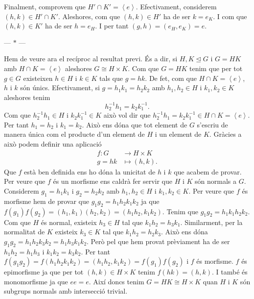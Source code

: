 \documentclass[12pt]{article}
\newcommand{\gen}[1]{\left\langle #1 \right\rangle}
\newcommand{\normal}{\trianglelefteq}
\newcommand{\parbreak}{
	\begin{center}
		--- $\ast$ ---
	\end{center} 
}
\begin{document}
Finalment, comprovem que \( H' \cap K' = \gen{e} \). Efectivament, considerem \( (h,k) \in H' \cap K' \). Aleshores, com que \( (h,k) \in H' \) ha de ser \( k = e_K \). I com que \( (h,k) \in K' \) ha de ser \( h = e_H \). I per tant \( (g,h) = (e_H, e_K) = e \).

\parbreak

Hem de veure ara el recíproc al resultat previ. És a dir, si \( H,K \normal G \) i \( G = HK \) amb \( H \cap K = \gen{e} \) aleshores \( G \cong H \times K \). Com que \( G = HK \) tenim que per tot \( g \in G \) existeixen \( h\in H \) i \( k \in K \) tals que \( g= hk \). De fet, com que \( H \cap K = \gen{e} \), \( h \) i \( k \) són únics. Efectivament, si \( g = h_1k_1 = h_2k_2 \) amb \( h_1,h_2 \in H \) i \( k_1,k_2 \in K \) aleshores tenim  
\begin{equation*}
h_2^{-1}h_1 = k_2k_1^{-1}.
\end{equation*}
Com que \( h_2^{-1}h_1 \in H \) i \( k_2k_1^{-1} \in K \) això vol dir que \( h_2^{-1}h_1 = k_2k_1^{-1} \in H \cap K = \gen{e} \). Per tant \( h_1 = h_2 \) i \( k_1 = k_2 \). Això ens dóna que tot element de \( G \) s'escriu de manera única com el producte d'un element de \( H \) i un element de \( K \). Gràcies a això podem definir una aplicació 
\begin{align*}
	f \colon G & \longrightarrow H \times K \\
	g = hk & \longmapsto (h,k).
\end{align*}
Que \( f \) està ben definida ens ho dóna la unicitat de \( h \) i \( k \) que acabem de provar. Per veure que \( f \) és un morfisme ens caldrà fer servir que \( H \) i \( K \) són normals a \( G \). Considerem \( g_1 = h_1k_1 \) i \( g_2 = h_2k_2 \) amb \( h_1,h_2 \in H \) i \( k_1,k_2 \in K \). Per veure que \( f \) és morfisme hem de provar que \( g_1g_2 = h_1h_2k_1k_2 \) ja que \( f(g_1)f(g_2) = (h_1,k_1)(h_2,k_2) = (h_1h_2,k_1k_2) \). Tenim que \( g_1g_2 = h_1k_1h_2k_2 \). Com que \( H \) és normal, existeix \( h_3 \in H \) tal que \( k_1h_2 = h_3k_1 \). Similarment, per la normalitat de \( K \) existeix \( k_3 \in K \) tal que \( k_1h_2 = h_2k_3 \). Això ens dóna \( g_1g_2 = h_1h_2k_3k_2 = h_1h_3k_1k_2 \). Però pel que hem provat prèviament ha de ser \( h_1h_2 = h_1h_3 \) i \( k_1k_2 = k_3k_2 \). Per tant \( f(g_1g_2) = f(h_1h_2k_1k_2) = (h_1h_2,k_1k_2) = f(g_1)f(g_2) \) i \( f \) és morfisme. \( f \) és epimorfisme ja que per tot \( (h,k) \in H \times K \) tenim \( f(hk) = (h,k) \). I també és monomorfisme ja que \( ee = e \). Així doncs tenim \( G = HK \cong H \times K \) quan \( H \) i \( K \) són subgrups normals amb intersecció trivial.
\end{document}
